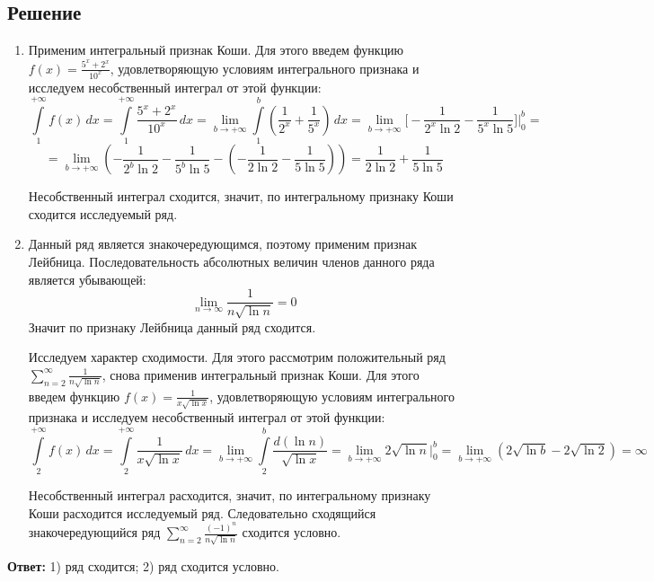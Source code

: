 \documentclass[12pt]{article}
\begin{document}
	\subsection*{Решение}
	\begin{enumerate}[wide, labelwidth=!, labelindent=0pt]
		\item Применим интегральный признак Коши. Для этого введем функцию $ f(x) = \frac{5^x + 2^x}{10^x} $, удовлетворяющую условиям интегрального признака и исследуем несобственный интеграл от этой функции:		
		$$ \int \limits_1^{+ \infty} f(x) \, dx = \int \limits_1^{+ \infty} \frac{5^x + 2^x}{10^x} \, dx = \lim_{b \to + \infty} \int \limits_1^b ( \frac{1}{2^x} + \frac{1}{5^x}) \, dx = \lim_{b \to + \infty} \Big[ - \frac{1}{ 2^x \ln{2} } - \frac{1}{ 5^x \ln{5} } \Big] \Big|_0^b = $$
		$$ = \lim_{b \to + \infty} ( - \frac{1}{ 2^b \ln{2} } - \frac{1}{ 5^b \ln{5} } - (- \frac{1}{ 2 \ln{2} } - \frac{1}{ 5 \ln{5} } ) )  =  \frac{1}{ 2 \ln{2} } + \frac{1}{ 5 \ln{5} }$$

		Несобственный интеграл сходится, значит, по интегральному признаку Коши сходится исследуемый ряд. 

		\item Данный ряд является знакочередующимся, поэтому применим признак Лейбница. Последовательность абсолютных величин членов данного ряда является убывающей:
		$$ \lim_{n \to \infty} \frac{1}{n\sqrt{\ln{n}}} = 0 $$
		Значит по признаку Лейбница данный ряд сходится.

		Исследуем характер сходимости. Для этого рассмотрим положительный ряд $ \sum_{n=2}^{\infty} \frac{1}{n\sqrt{\ln{n}}} $, снова применив интегральный признак Коши. Для этого введем функцию $ f(x) = \frac{1}{x\sqrt{\ln{x}}} $, удовлетворяющую условиям интегрального признака и исследуем несобственный интеграл от этой функции:
		$$ \int \limits_2^{+ \infty} f(x) \, dx = \int \limits_2^{+ \infty} \frac{1}{x\sqrt{\ln{x}}} \, dx = \lim_{b \to + \infty} \int \limits_2^b \frac{d(\ln{n})}{\sqrt{\ln{x}}} = \lim_{b \to + \infty} 2\sqrt{\ln{n}} \Big|_0^b = \lim_{b \to + \infty} ( 2\sqrt{\ln{b}} - 2\sqrt{\ln{2}} ) = \infty $$

		Несобственный интеграл расходится, значит, по интегральному признаку Коши расходится исследуемый ряд. Следовательно сходящийся знакочередующийся ряд $ \sum_{n=2}^{\infty} \frac{(-1)^n}{n\sqrt{\ln{n}}} $ сходится условно. 		
	\end{enumerate}

	\hspace{200pt}\textbf{Ответ:} 1) ряд сходится; 2) ряд сходится условно.
\end{document}
